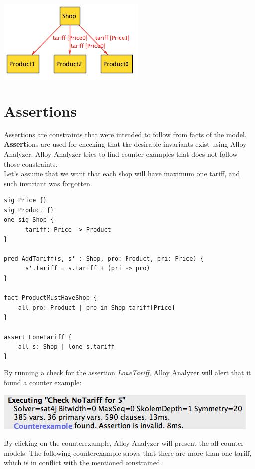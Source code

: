 \documentclass[oneside]{book}
\begin{document}
\begin{center}
\includegraphics[scale=0.6]{shop5}
\end{center}

\section{Assertions}
Assertions are constraints that were intended to follow from facts of the model. \textbf{Assert}ions are used for checking that the desirable invariants exist using Alloy Analyzer. Alloy Analyzer tries to find counter examples that does not follow those constraints.\\

Let's assume that we want that each shop will have maximum one tariff, and such invariant was forgotten.

\begin{lstlisting}
sig Price {}
sig Product {}
one sig Shop {
	  tariff: Price -> Product
}

pred AddTariff(s, s' : Shop, pro: Product, pri: Price) {
	  s'.tariff = s.tariff + (pri -> pro)
}

fact ProductMustHaveShop {
	all pro: Product | pro in Shop.tariff[Price]
}

assert LoneTariff {
	all s: Shop | lone s.tariff
}
\end{lstlisting}

By running a check for the assertion \textit{LoneTariff}, Alloy Analyzer will alert that it found a counter example:

\begin{center}
\includegraphics[scale=0.6]{counterexample}
\end{center}

By clicking on the counterexample, Alloy Analyzer will present the all counter-models. The following counterexample shows that there are more than one tariff, which is in conflict with the mentioned constrained. 
\end{document}

